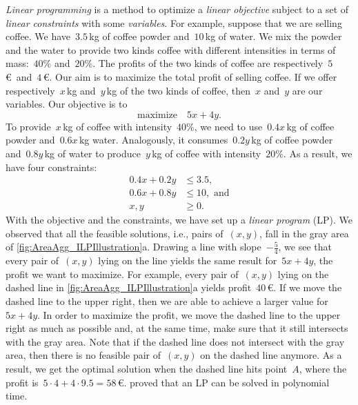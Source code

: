 \documentclass[acmsmall,natbib=false]{acmart}
\begin{document}
\emph{Linear programming} is a method 
to optimize a \emph{linear objective}
subject to a set of \emph{linear constraints}
with some \emph{variables}.
For example, suppose that we are selling coffee.
We have~$3.5\,$kg of coffee powder and~$10\,$kg of water.
We mix the powder and the water to provide two kinds coffee 
with different intensities in terms of mass:~$40\%$ and~$20\%$.
The profits of the two kinds of coffee 
are respectively~$5\,$\euro~and~$4\,$\euro.
Our aim is to maximize the total profit of selling coffee.
If we offer respectively~$x\,$kg and~$y\,$kg 
of the two kinds of coffee,
then~$x$ and~$y$ are our variables.
Our objective is to
$$
\mathrm{maximize} 	\quad	 5x+4y.
$$
To provide~$x\,$kg of coffee with intensity~$40\%$,
we need to use~$0.4x\,$kg of coffee powder 
and~$0.6x\,$kg water.
Analogously, it consumes~$0.2y\,$kg of coffee powder 
and~$0.8y\,$kg of water to produce~$y\,$kg of coffee
with intensity~$20\%$.
As a result, we have four constraints:
\begin{align*}
0.4x+0.2y	&\le 3.5,				\\
0.6x+0.8y 	&\le 10,	\text{~and}			\\
x,y			&\ge 0.
\end{align*}
With the objective and the constraints, 
we have set up a \emph{linear program} (LP).
We observed that 
all the feasible solutions, i.e., pairs of~$(x,y)$,
fall in the gray area of
\fig\ref{fig:AreaAgg_ILPIllustration}a.
Drawing a line with slope~$-\frac{5}{4}$,
we see that every pair of~$(x,y)$ lying on the line
yields the same result for~$5x+4y$, 
the profit we want to maximize.
For example, every pair of~$(x,y)$ lying on the dashed line
in \fig\ref{fig:AreaAgg_ILPIllustration}a 
yields profit~$40\,$\euro.
If we move the dashed line to the upper right,
then we are able to achieve a larger value for~$5x+4y$. 
In order to maximize the profit, 
we move the dashed line to the upper right as much as possible
and, at the same time, make sure that 
it still intersects with the gray area.
Note that if the dashed line 
does not intersect with the gray area,
then there is no feasible pair of~$(x,y)$ 
on the dashed line anymore.
As a result, we get the optimal solution 
when the dashed line hits point~$A$,
where the profit is~$5 \cdot 4 + 4 \cdot 9.5 =58\,$\euro.
\textcite{Karmarkar1984LP}
proved that an LP can be solved in polynomial time.
\end{document}
